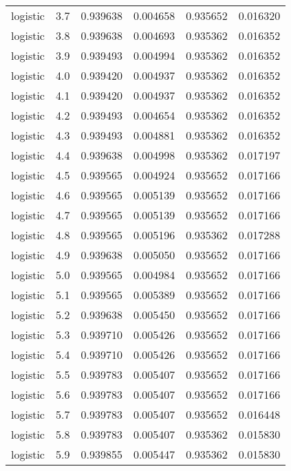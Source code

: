 \begin{tabular}{lrrrrr}
logistic &        3.7 &    0.939638 &   0.004658 &   0.935652 &  0.016320 \\
logistic &        3.8 &    0.939638 &   0.004693 &   0.935362 &  0.016352 \\
logistic &        3.9 &    0.939493 &   0.004994 &   0.935362 &  0.016352 \\
logistic &        4.0 &    0.939420 &   0.004937 &   0.935362 &  0.016352 \\
logistic &        4.1 &    0.939420 &   0.004937 &   0.935362 &  0.016352 \\
logistic &        4.2 &    0.939493 &   0.004654 &   0.935362 &  0.016352 \\
logistic &        4.3 &    0.939493 &   0.004881 &   0.935362 &  0.016352 \\
logistic &        4.4 &    0.939638 &   0.004998 &   0.935362 &  0.017197 \\
logistic &        4.5 &    0.939565 &   0.004924 &   0.935652 &  0.017166 \\
logistic &        4.6 &    0.939565 &   0.005139 &   0.935652 &  0.017166 \\
logistic &        4.7 &    0.939565 &   0.005139 &   0.935652 &  0.017166 \\
logistic &        4.8 &    0.939565 &   0.005196 &   0.935362 &  0.017288 \\
logistic &        4.9 &    0.939638 &   0.005050 &   0.935652 &  0.017166 \\
logistic &        5.0 &    0.939565 &   0.004984 &   0.935652 &  0.017166 \\
logistic &        5.1 &    0.939565 &   0.005389 &   0.935652 &  0.017166 \\
logistic &        5.2 &    0.939638 &   0.005450 &   0.935652 &  0.017166 \\
logistic &        5.3 &    0.939710 &   0.005426 &   0.935652 &  0.017166 \\
logistic &        5.4 &    0.939710 &   0.005426 &   0.935652 &  0.017166 \\
logistic &        5.5 &    0.939783 &   0.005407 &   0.935652 &  0.017166 \\
logistic &        5.6 &    0.939783 &   0.005407 &   0.935652 &  0.017166 \\
logistic &        5.7 &    0.939783 &   0.005407 &   0.935652 &  0.016448 \\
logistic &        5.8 &    0.939783 &   0.005407 &   0.935362 &  0.015830 \\
logistic &        5.9 &    0.939855 &   0.005447 &   0.935362 &  0.015830 \\

\end{tabular}
